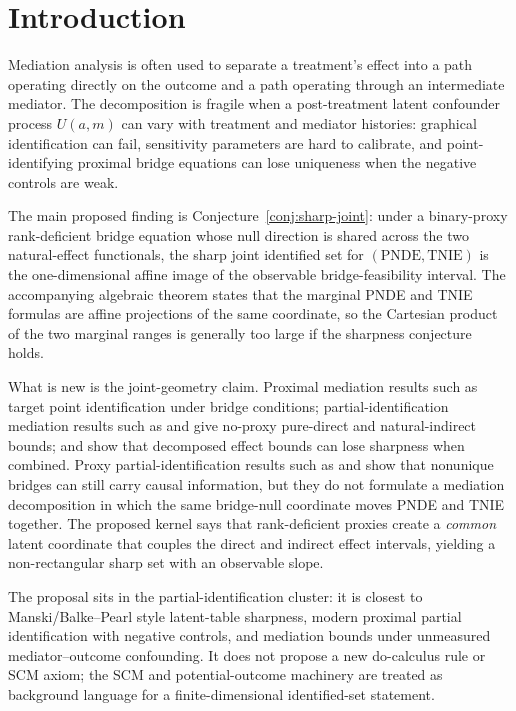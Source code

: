 \documentclass[11pt]{article}
\theoremstyle{definition}
\theoremstyle{plain}
\theoremstyle{remark}
\begin{document}
\section{Introduction}
Mediation analysis is often used to separate a treatment's effect into a
path operating directly on the outcome and a path operating through an
intermediate mediator.  The decomposition is fragile when a post-treatment
latent confounder process \(U(a,m)\) can vary with treatment and mediator
histories: graphical identification can fail, sensitivity parameters are hard
to calibrate, and point-identifying proximal bridge equations can lose
uniqueness when the negative controls are weak.

The main proposed finding is Conjecture~\ref{conj:sharp-joint}: under a
binary-proxy rank-deficient bridge equation whose null direction is shared
across the two natural-effect functionals, the sharp joint identified set for
\((\mathrm{PNDE},\mathrm{TNIE})\) is the one-dimensional affine image of the
observable bridge-feasibility interval.  The accompanying algebraic theorem
states that the marginal PNDE and TNIE formulas are affine projections of the
same coordinate, so the Cartesian product of the two marginal ranges is
generally too large if the sharpness conjecture holds.

What is new is the joint-geometry claim.  Proximal mediation results such as
\citet{DukesShpitserTchetgen2023} target point identification under bridge
conditions; partial-identification mediation results such as
\citet{MilesKankiMeloniTchetgen2015} and
\citet{MilesKankiMeloniTchetgen2017} give no-proxy pure-direct and
natural-indirect bounds; and \citet{GabrielSachsSjolander2023} show that
decomposed effect bounds can lose sharpness when combined.  Proxy
partial-identification results such as
\citet{ZhangLiMiaoTchetgen2023} and
\citet{GhassamiShpitserTchetgen2023} show that nonunique bridges can still
carry causal information, but they do not formulate a mediation decomposition
in which the same bridge-null coordinate moves PNDE and TNIE together.  The
proposed kernel says that rank-deficient proxies create a \emph{common} latent
coordinate that couples the direct and indirect effect intervals, yielding a
non-rectangular sharp set with an observable slope.

The proposal sits in the partial-identification cluster: it is closest to
Manski/Balke--Pearl style latent-table sharpness, modern proximal partial
identification with negative controls, and mediation bounds under unmeasured
mediator--outcome confounding.  It does not propose a new do-calculus rule or
SCM axiom; the SCM and potential-outcome machinery are treated as background
language for a finite-dimensional identified-set statement.
\end{document}
